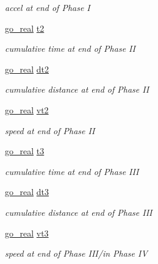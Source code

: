 \begin{DoxyCompactItemize}
\begin{DoxyCompactList}\small\item\em accel at end of Phase I \end{DoxyCompactList}\item 
\hyperlink{gotypes_8h_afd666a2393eebd71ee455846ac9def9b}{go\-\_\-real} \hyperlink{structgomotion_1_1go__traj__cj__spec_a5ca2f4ce792da1cc4167dc6da836617b}{t2}
\begin{DoxyCompactList}\small\item\em cumulative time at end of Phase I\-I \end{DoxyCompactList}\item 
\hyperlink{gotypes_8h_afd666a2393eebd71ee455846ac9def9b}{go\-\_\-real} \hyperlink{structgomotion_1_1go__traj__cj__spec_a4b7feebd01590f6ed1abaa3abb9b6ec1}{dt2}
\begin{DoxyCompactList}\small\item\em cumulative distance at end of Phase I\-I \end{DoxyCompactList}\item 
\hyperlink{gotypes_8h_afd666a2393eebd71ee455846ac9def9b}{go\-\_\-real} \hyperlink{structgomotion_1_1go__traj__cj__spec_a51ff6be4a6f00e4b787b50cd96c6fbb2}{vt2}
\begin{DoxyCompactList}\small\item\em speed at end of Phase I\-I \end{DoxyCompactList}\item 
\hyperlink{gotypes_8h_afd666a2393eebd71ee455846ac9def9b}{go\-\_\-real} \hyperlink{structgomotion_1_1go__traj__cj__spec_acf3182b00a84c0663d29e66dfde095b5}{t3}
\begin{DoxyCompactList}\small\item\em cumulative time at end of Phase I\-I\-I \end{DoxyCompactList}\item 
\hyperlink{gotypes_8h_afd666a2393eebd71ee455846ac9def9b}{go\-\_\-real} \hyperlink{structgomotion_1_1go__traj__cj__spec_aa921d425e5a718839a3487a5657c9511}{dt3}
\begin{DoxyCompactList}\small\item\em cumulative distance at end of Phase I\-I\-I \end{DoxyCompactList}\item 
\hyperlink{gotypes_8h_afd666a2393eebd71ee455846ac9def9b}{go\-\_\-real} \hyperlink{structgomotion_1_1go__traj__cj__spec_ac50e142a4852e8176bc1e03d57658917}{vt3}
\begin{DoxyCompactList}\small\item\em speed at end of Phase I\-I\-I/in Phase I\-V \end{DoxyCompactList}\item 

\end{DoxyCompactItemize}
